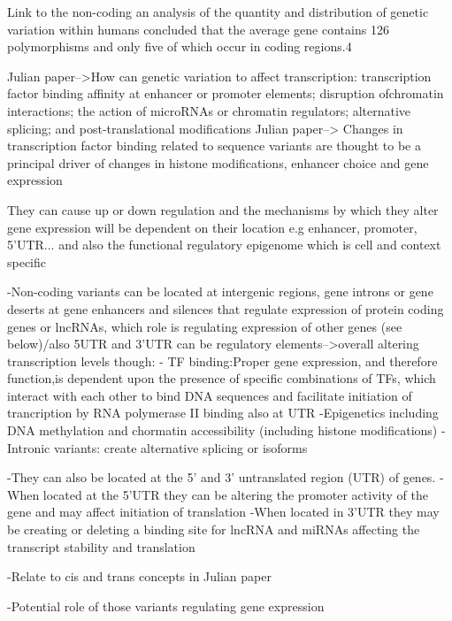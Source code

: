 Link to the non-coding an analysis of the quantity and distribution of genetic variation within humans concluded that the average gene contains 126 polymorphisms and only five of which occur in coding regions.4

Julian paper-->How can genetic variation to affect transcription: transcription factor binding affinity at enhancer or promoter elements; disruption ofchromatin   interactions;   the   action   of   microRNAs   or chromatin   regulators;   alternative   splicing;   and   post-translational modifications
Julian paper-->  Changes in transcription factor binding   related   to   sequence   variants   are   thought   to   be   a principal driver of changes in histone modifications, enhancer choice and gene expression

They can cause up or down regulation and the mechanisms by which they alter gene expression will be dependent on their location e.g enhancer, promoter, 5'UTR... and also the functional regulatory epigenome which is cell and context specific

-Non-coding variants can be located at  intergenic regions, gene introns or gene deserts at gene enhancers and silences that regulate expression of protein coding genes or lncRNAs, which role is regulating expression of other genes (see below)/also 5UTR and 3'UTR can be regulatory elements-->overall altering transcription levels though: 
	- TF binding:Proper gene expression, and therefore function,is   dependent   upon   the   presence   of   specific   combinations   of   TFs,   which   interact   with   each   other   to bind DNA sequences and facilitate initiation of trancription by RNA polymerase II binding also at UTR
	-Epigenetics including DNA methylation and chormatin accessibility (including histone modifications)
-Intronic variants: create alternative splicing or isoforms

-They can also be located at the 5' and 3' untranslated region (UTR) of genes. 
	-When located at the 5'UTR they can be altering the promoter activity of the gene and may affect initiation of translation
	-When located in 3'UTR they may be creating or deleting a binding site for lncRNA and miRNAs affecting the transcript stability and translation


-Relate to cis and trans concepts in Julian paper




-Potential role of those variants regulating gene expression




